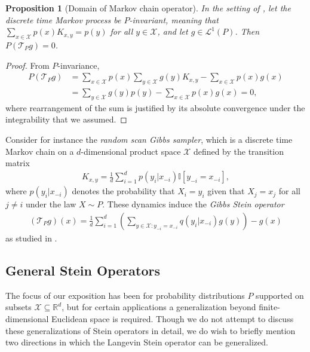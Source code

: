\documentclass[12pt,paper=letter]{scrreprt}
\newtheorem{proposition}{Proposition}[chapter]
\def\mbb#1{\mathbb{#1}}
\def\indic#1{\mbb{I}\left[{#1}\right]} %
\newcommand{\xset}[0]{\mathcal{X}} %
\newcommand{\TP}{\mathcal{T}_P}
\newcommand{\Lp}[1][p]{\mathcal{L}^{#1}}
\begin{document}
\begin{proposition}[Domain of Markov chain operator]
In the setting of , let the discrete time Markov process be $P$-invariant, meaning that $\sum_{x \in \mathcal{X}} p(x) K_{x,y} = p(y)$ for all $y \in \xset$, and let $g \in \Lp[1](P)$.
    Then $P(\TP g) = 0$.
\end{proposition}
\begin{proof}
    From $P$-invariance,
    \begin{align*}
        P(\TP g) & = \sum_{x \in \xset} p(x) \sum_{y \in \xset} g(y) K_{x,y} - \sum_{x \in \xset} p(x) g(x) \\
        & = \sum_{y \in \xset} g(y) p(y) - \sum_{x \in \xset} p(x) g(x) = 0 ,
    \end{align*}
    where rearrangement of the sum is justified by its absolute convergence under the integrability that we assumed.
\end{proof}

Consider for instance the \emph{random scan Gibbs sampler}, which is a discrete time Markov chain on a $d$-dimensional product space $\xset$ defined by the transition matrix
\begin{align*}
	K_{x,y} = \frac{1}{d}\sum_{i=1}^d p(y_i|x_{-i})\indic{y_{-i} = x_{-i}}, 
\end{align*}
where $p(y_i | x_{-i})$ denotes the probability that $X_i = y_i$ given that $X_j = x_j$ for all $j \neq i$ under the law $X \sim P$.
These dynamics induce the \emph{Gibbs Stein operator} 
\begin{align}
    (\TP g)(x) = \frac{1}{d} \sum_{i=1}^d \left( \sum_{y \in \xset : y_{-i}=x_{-i} } q(y_i|x_{-i}) g(y) \right) - g(x) \label{eq: Gibbs stein operator}
\end{align}    
as studied in \citet{bresler2019stein,reinert2019approximating,shi2022gradient}.


\subsection{General Stein Operators}
\label{subsec: operators in general}

The focus of our exposition has been for probability distributions $P$ supported on subsets $\mathcal{X} \subseteq \mathbb{R}^d$, but for certain applications a generalization beyond finite-dimensional Euclidean space is required.
Though we do not attempt to discuss these generalizations of Stein operators in detail, we do wish to briefly mention two directions in which the Langevin Stein operator can be generalized.
\end{document}
